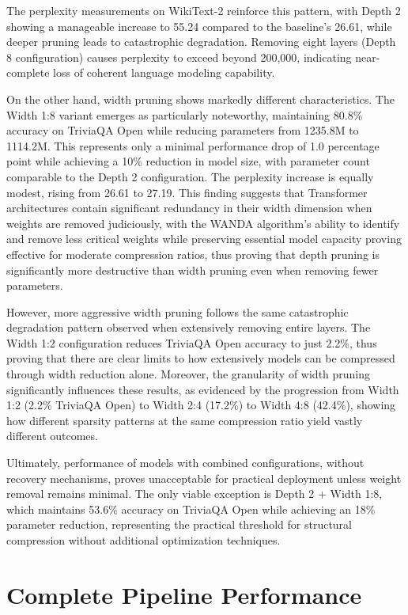 The perplexity measurements on WikiText-2 reinforce this pattern, with Depth 2 showing a manageable increase to 55.24 compared to the baseline's 26.61, while deeper pruning leads to catastrophic degradation. Removing eight layers (Depth 8 configuration) causes perplexity to exceed beyond 200,000, indicating near-complete loss of coherent language modeling capability.

On the other hand, width pruning shows markedly different characteristics. The Width 1:8 variant emerges as particularly noteworthy, maintaining 80.8\% accuracy on TriviaQA Open while reducing parameters from 1235.8M to 1114.2M. This represents only a minimal performance drop of 1.0 percentage point while achieving a 10\% reduction in model size, with parameter count comparable to the Depth 2 configuration. The perplexity increase is equally modest, rising from 26.61 to 27.19. This finding suggests that Transformer architectures contain significant redundancy in their width dimension when weights are removed judiciously, with the WANDA algorithm's ability to identify and remove less critical weights while preserving essential model capacity proving effective for moderate compression ratios, thus proving that depth pruning is significantly more destructive than width pruning even when removing fewer parameters.

However, more aggressive width pruning follows the same catastrophic degradation pattern observed when extensively removing entire layers. The Width 1:2 configuration reduces TriviaQA Open accuracy to just 2.2\%, thus proving that there are clear limits to how extensively models can be compressed through width reduction alone.
Moreover, the granularity of width pruning significantly influences these results, as evidenced by the progression from Width 1:2 (2.2\% TriviaQA Open) to Width 2:4 (17.2\%) to Width 4:8 (42.4\%), showing how different sparsity patterns at the same compression ratio yield vastly different outcomes.

Ultimately, performance of models with combined configurations, without recovery mechanisms, proves unacceptable for practical deployment unless weight removal remains minimal. The only viable exception is Depth 2 + Width 1:8, which maintains 53.6\% accuracy on TriviaQA Open while achieving an 18\% parameter reduction, representing the practical threshold for structural compression without additional optimization techniques.



\section{Complete Pipeline Performance}

